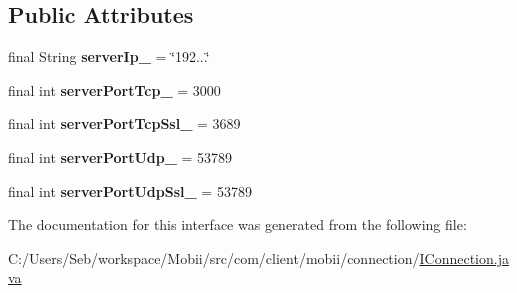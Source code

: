 \subsection*{Public Attributes}
\begin{DoxyCompactItemize}
\item 
\hypertarget{interfacecom_1_1client_1_1mobii_1_1connection_1_1_i_connection_a93dff481e828de10ff1a4394e43a824c}{final String {\bfseries server\-Ip\-\_\-} = \char`\"{}192...\char`\"{}}\label{interfacecom_1_1client_1_1mobii_1_1connection_1_1_i_connection_a93dff481e828de10ff1a4394e43a824c}

\item 
\hypertarget{interfacecom_1_1client_1_1mobii_1_1connection_1_1_i_connection_aaa138172bf8a0561595381652de82a88}{final int {\bfseries server\-Port\-Tcp\-\_\-} = 3000}\label{interfacecom_1_1client_1_1mobii_1_1connection_1_1_i_connection_aaa138172bf8a0561595381652de82a88}

\item 
\hypertarget{interfacecom_1_1client_1_1mobii_1_1connection_1_1_i_connection_a48b4cbca95b8a3c52d67b3f60108067c}{final int {\bfseries server\-Port\-Tcp\-Ssl\-\_\-} = 3689}\label{interfacecom_1_1client_1_1mobii_1_1connection_1_1_i_connection_a48b4cbca95b8a3c52d67b3f60108067c}

\item 
\hypertarget{interfacecom_1_1client_1_1mobii_1_1connection_1_1_i_connection_a3f883f15fa818f5e55ec2ace5fb31d79}{final int {\bfseries server\-Port\-Udp\-\_\-} = 53789}\label{interfacecom_1_1client_1_1mobii_1_1connection_1_1_i_connection_a3f883f15fa818f5e55ec2ace5fb31d79}

\item 
\hypertarget{interfacecom_1_1client_1_1mobii_1_1connection_1_1_i_connection_a1761b15a07d7f8bf76898f08e4e20ab0}{final int {\bfseries server\-Port\-Udp\-Ssl\-\_\-} = 53789}\label{interfacecom_1_1client_1_1mobii_1_1connection_1_1_i_connection_a1761b15a07d7f8bf76898f08e4e20ab0}

\end{DoxyCompactItemize}


The documentation for this interface was generated from the following file\-:\begin{DoxyCompactItemize}
\item 
C\-:/\-Users/\-Seb/workspace/\-Mobii/src/com/client/mobii/connection/\hyperlink{_i_connection_8java}{I\-Connection.\-java}\end{DoxyCompactItemize}
